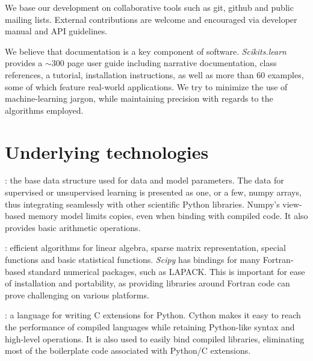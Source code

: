 \documentclass[twoside,11pt]{article}
\begin{document}
\smallskip
{}
%
We base our development on collaborative tools such as git, github and
public mailing lists. External contributions are welcome and
encouraged via developer manual and API guidelines.

\smallskip {}
%
We believe that documentation is a key component of software.
\emph{Scikits.learn} provides a $\sim$300 page user guide including
narrative documentation, class references, a tutorial, installation
instructions, as well as more than 60 examples, some of which feature
real-world applications. We try to minimize the use of
machine-learning jargon, while maintaining precision with
regards to the algorithms employed.


\section{Underlying technologies}



:
%
the base data structure used for data and model parameters.
The data for supervised or unsupervised learning is
presented as one, or a few, numpy arrays, thus integrating seamlessly
with other scientific Python libraries. Numpy's view-based memory
model limits copies, even when binding with compiled code. It also
provides basic arithmetic operations.

\smallskip
{}:
%
%
efficient algorithms for linear algebra, sparse matrix representation,
special functions and basic statistical functions. {\sl Scipy} has
bindings for many Fortran-based standard numerical packages, such as
LAPACK. This is important for ease of installation and portability, as
providing libraries around Fortran code can prove challenging on
various platforms.

\smallskip
{}:
%
a language for writing C extensions for Python. Cython makes it easy to
reach the performance of compiled languages while retaining
Python-like syntax and high-level operations. It is also used to
easily bind compiled libraries, eliminating most of the boilerplate code
associated with Python/C extensions.
\end{document}
